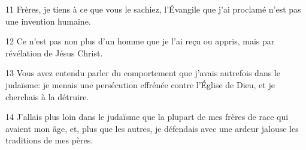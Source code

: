 
11 Frères, je tiens à ce que vous le sachiez, l’Évangile que j’ai proclamé n’est pas une invention humaine.

12 Ce n’est pas non plus d’un homme que je l’ai reçu ou appris, mais par révélation de Jésus Christ.

13 Vous avez entendu parler du comportement que j’avais autrefois dans le judaïsme: je menais une persécution effrénée contre l’Église de Dieu, et je cherchais à la détruire.

14 J’allais plus loin dans le judaïsme que la plupart de mes frères de race qui avaient mon âge, et, plus que les autres, je défendais avec une ardeur jalouse les traditions de mes pères.